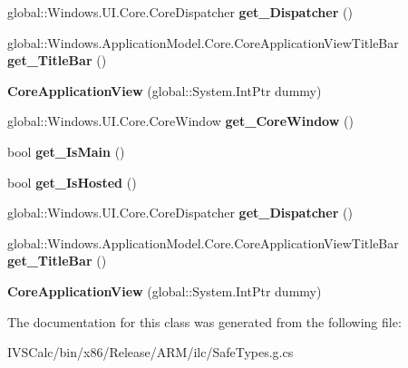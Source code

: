 \begin{DoxyCompactItemize}
global\+::\+Windows.\+U\+I.\+Core.\+Core\+Dispatcher {\bfseries get\+\_\+\+Dispatcher} ()
\item 
\mbox{\label{class_windows_1_1_application_model_1_1_core_1_1_core_application_view_a3019f6ab113ca8bc442c591f5cb35e5d}} 
global\+::\+Windows.\+Application\+Model.\+Core.\+Core\+Application\+View\+Title\+Bar {\bfseries get\+\_\+\+Title\+Bar} ()
\item 
\mbox{\label{class_windows_1_1_application_model_1_1_core_1_1_core_application_view_a7f2958bb867e52abb737c302fe562838}} 
{\bfseries Core\+Application\+View} (global\+::\+System.\+Int\+Ptr dummy)
\item 
\mbox{\label{class_windows_1_1_application_model_1_1_core_1_1_core_application_view_a7cfe4f4a49ed78d0ae11a16e6cebc507}} 
global\+::\+Windows.\+U\+I.\+Core.\+Core\+Window {\bfseries get\+\_\+\+Core\+Window} ()
\item 
\mbox{\label{class_windows_1_1_application_model_1_1_core_1_1_core_application_view_ae303c87bc500fe45edef23e4dea23518}} 
bool {\bfseries get\+\_\+\+Is\+Main} ()
\item 
\mbox{\label{class_windows_1_1_application_model_1_1_core_1_1_core_application_view_a8dc7e59605e7f56708e128508f7cc977}} 
bool {\bfseries get\+\_\+\+Is\+Hosted} ()
\item 
\mbox{\label{class_windows_1_1_application_model_1_1_core_1_1_core_application_view_a9d7c8b64ee6c13bc8a8e92f9e48c4ccc}} 
global\+::\+Windows.\+U\+I.\+Core.\+Core\+Dispatcher {\bfseries get\+\_\+\+Dispatcher} ()
\item 
\mbox{\label{class_windows_1_1_application_model_1_1_core_1_1_core_application_view_a3019f6ab113ca8bc442c591f5cb35e5d}} 
global\+::\+Windows.\+Application\+Model.\+Core.\+Core\+Application\+View\+Title\+Bar {\bfseries get\+\_\+\+Title\+Bar} ()
\item 
\mbox{\label{class_windows_1_1_application_model_1_1_core_1_1_core_application_view_a7f2958bb867e52abb737c302fe562838}} 
{\bfseries Core\+Application\+View} (global\+::\+System.\+Int\+Ptr dummy)
\end{DoxyCompactItemize}


The documentation for this class was generated from the following file\+:\begin{DoxyCompactItemize}
\item 
I\+V\+S\+Calc/bin/x86/\+Release/\+A\+R\+M/ilc/Safe\+Types.\+g.\+cs\end{DoxyCompactItemize}
